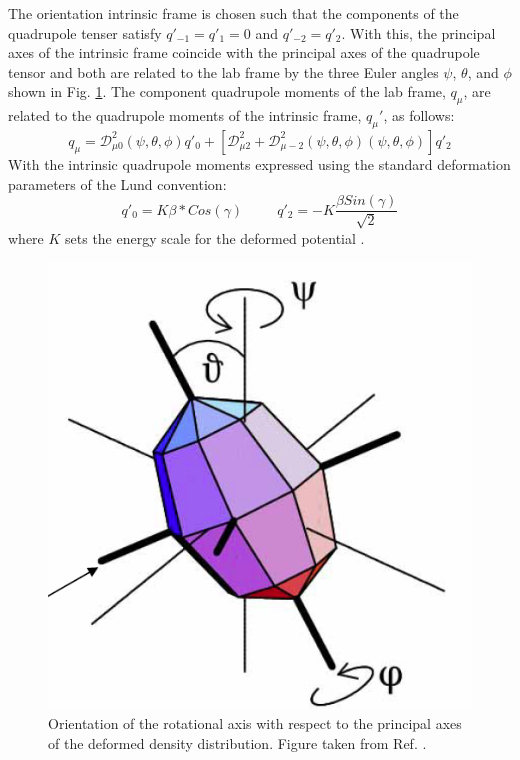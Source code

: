 The orientation intrinsic frame is chosen such that the components of the quadrupole tenser satisfy $q'_{-1}=q'_1=0$ and $q'_{-2}=q'_2$. With this, the principal axes of the intrinsic frame coincide with the principal axes of the quadrupole tensor and both are related to the lab frame by the three Euler angles $\psi$, $\theta$, and $\phi$ shown in Fig. \ref{fig:chp2-TAC-euler-angles}. The component quadrupole moments of the lab frame, $q_{\mu}$, are related to the quadrupole moments of the intrinsic frame, $q_{\mu}'$, as follows:
\begin{equation}
\label{eqn:chp2-intrin-quad-to-lab-quad}
q_{\mu} = \mathcal{D}^2_{\mu{}0}(\psi,\theta,\phi)q'_0+\left[\mathcal{D}^2_{\mu{}2}+\mathcal{D}^2_{\mu{}-2}(\psi,\theta,\phi)(\psi,\theta,\phi)\right]q'_2
\end{equation}
With the intrinsic quadrupole moments expressed using the standard deformation parameters of the Lund convention:
\begin{equation}
\label{eqn:chp2-lund-conv-quad-moments}
q'_0=K\beta{}*Cos(\gamma) ~~~~~~~~~~~ q'_2 = -K\frac{\beta{}Sin(\gamma)}{\sqrt{2}}
\end{equation}
where $K$ sets the energy scale for the deformed potential \cite{frauendorfTAC}.
\begin{figure}[t!]
\centerline{\includegraphics[height=0.3\textheight]{./img/c2/tiltorientation.png}}
	\caption{Orientation of the rotational axis with respect to the principal axes of the deformed density distribution. Figure taken from Ref. \cite{danielDissertation}.\label{fig:chp2-TAC-euler-angles}}
\end{figure}

